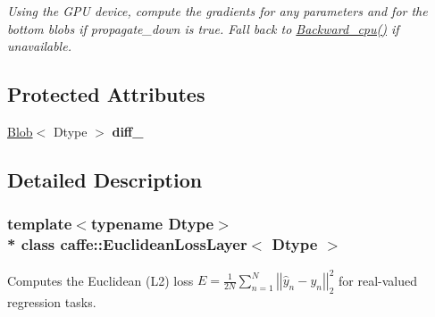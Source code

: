 \begin{DoxyCompactItemize}
\begin{DoxyCompactList}\small\item\em Using the G\+PU device, compute the gradients for any parameters and for the bottom blobs if propagate\+\_\+down is true. Fall back to \hyperlink{classcaffe_1_1EuclideanLossLayer_afc83c3980206b9c24b5985819c13475c}{Backward\+\_\+cpu()} if unavailable. \end{DoxyCompactList}\end{DoxyCompactItemize}
\subsection*{Protected Attributes}
\begin{DoxyCompactItemize}
\item 
\hyperlink{classcaffe_1_1Blob}{Blob}$<$ Dtype $>$ {\bfseries diff\+\_\+}\hypertarget{classcaffe_1_1EuclideanLossLayer_a47ec68365879c820f9e18e456f93376a}{}\label{classcaffe_1_1EuclideanLossLayer_a47ec68365879c820f9e18e456f93376a}

\end{DoxyCompactItemize}


\subsection{Detailed Description}
\subsubsection*{template$<$typename Dtype$>$\\*
class caffe\+::\+Euclidean\+Loss\+Layer$<$ Dtype $>$}

Computes the Euclidean (L2) loss $ E = \frac{1}{2N} \sum\limits_{n=1}^N \left| \left| \hat{y}_n - y_n \right| \right|_2^2 $ for real-\/valued regression tasks. 


